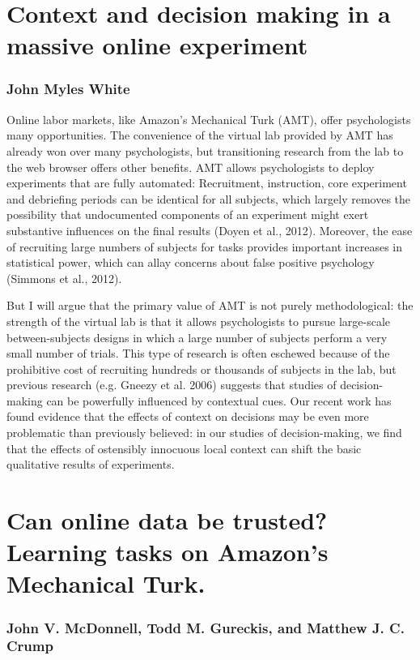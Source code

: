 \documentclass[10pt,letterpaper]{article}
\begin{document}
\section{Context and decision making in a massive online experiment}
\subsubsection{John Myles White}

Online labor markets, like Amazon's Mechanical Turk (AMT), offer psychologists
many opportunities.  The convenience of the virtual lab provided by AMT has
already won over many psychologists, but transitioning research from the lab to
the web browser offers other benefits. AMT allows psychologists to deploy
experiments that are fully automated: Recruitment, instruction, core
experiment and debriefing periods can be identical for all subjects, which
largely removes the possibility that undocumented components of an experiment
might exert substantive influences on the final results (Doyen et al., 2012).
\nocite{Doyen} Moreover, the ease of recruiting large numbers of subjects for
tasks provides important increases in statistical power, which can allay concerns
about false positive psychology (Simmons et al., 2012).  \nocite{Simmons} 

But I will argue that the primary value of AMT is not purely methodological: the
strength of the virtual lab is that it allows psychologists to pursue large-scale
between-subjects designs in which a large number of subjects perform a very small
number of trials.  This type of research is often eschewed because of the
prohibitive cost of recruiting hundreds or thousands of subjects in the lab, but
previous research (e.g. Gneezy et al. 2006) \nocite{Gneezy} suggests that studies
of decision-making can be powerfully influenced by contextual cues.  Our recent
work has found evidence that the effects of context on decisions may be even more
problematic than previously believed: in our studies of decision-making, we find
that the effects of ostensibly innocuous local context can shift the basic
qualitative results of experiments.

\section{Can online data be trusted? Learning tasks on Amazon's Mechanical Turk.}
\subsubsection{John V. McDonnell, Todd M. Gureckis, and Matthew J. C. Crump}
\end{document}
